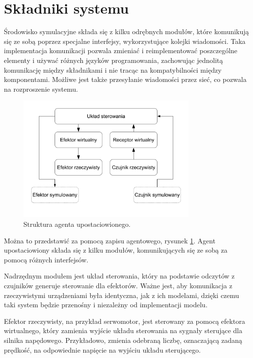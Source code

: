 \section{Składniki systemu}
	Środowisko symulacyjne składa się z kilku odrębnych modułów, które komunikują się ze sobą poprzez specjalne interfejsy, wykorzystujące kolejki wiadomości.
	Taka implementacja komunikacji pozwala zmieniać i reimplementować poszczególne elementy i używać różnych języków programowania, 
	zachowując jednolitą komunikację między składnikami i nie tracąc na kompatybilności między komponentami.
	Możliwe jest także przesyłanie wiadomości przez sieć, co pozwala na rozproszenie systemu.

	\begin{figure}[H]
	\centering
	\includegraphics[width=0.8\textwidth]{graphics/agent.pdf}
	\caption{Struktura agenta upostaciowionego.}
	\label{fig:agent}
	\end{figure} 

	Można to przedstawić za pomocą zapisu agentowego, rysunek \ref{fig:agent}.
	Agent upostaciowiony składa się z kilku modułów, komunikujących się ze sobą za pomocą różnych interfejsów.

	Nadrzędnym modułem jest układ sterowania, który na podstawie odczytów z czujników generuje sterowanie dla efektorów.
	Ważne jest, aby komunikacja z rzeczywistymi urządzeniami była identyczna, jak z ich modelami, dzięki czemu taki system będzie przenośny i niezależny od implementacji modelu.

	Efektor rzeczywisty, na przykład serwomotor, jest sterowany za pomocą efektora wirtualnego, który zamienia wyjście układu sterowania na sygnały sterujące dla silnika napędowego.
	Przykładowo, zmienia odebraną liczbę, oznaczającą zadaną prędkość, na odpowiednie napięcie na wyjściu układu sterującego.

